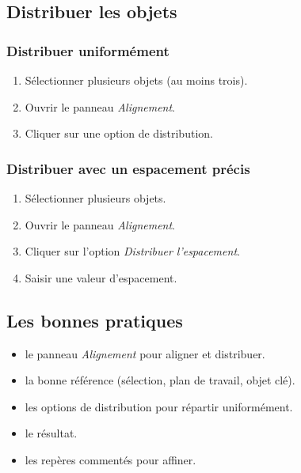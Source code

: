 \subsection{Distribuer les objets}

\subsubsection{Distribuer uniformément}

\begin{enumerate}
    \item Sélectionner plusieurs objets (au moins trois).
    \item Ouvrir le panneau \emph{Alignement}.
    \item Cliquer sur une option de distribution.
\end{enumerate}

\subsubsection{Distribuer avec un espacement précis}

\begin{enumerate}
    \item Sélectionner plusieurs objets.
    \item Ouvrir le panneau \emph{Alignement}.
    \item Cliquer sur l'option \emph{Distribuer l'espacement}.
    \item Saisir une valeur d'espacement.
\end{enumerate}

\subsection{Les bonnes pratiques}

\begin{itemize}
    \item {} le panneau \emph{Alignement} pour aligner et distribuer.
    \item {} la bonne référence (sélection, plan de travail, objet clé).
    \item {} les options de distribution pour répartir uniformément.
    \item {} le résultat.
    \item {} les repères commentés pour affiner.
\end{itemize}

